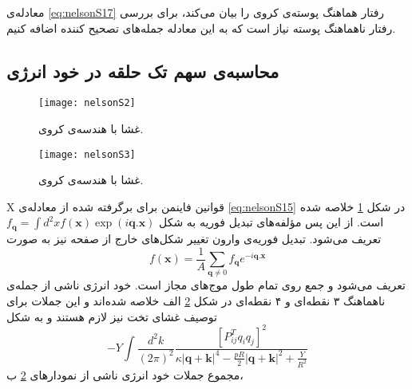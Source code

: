 معادله‌ی \ref{eq:nelsonS17}
 رفتار هماهنگ پوسته‌ی کروی را بیان می‌کند، برای بررسی رفتار ناهماهنگ پوسته نیاز است که به این معادله جمله‌های تصحیح کننده اضافه کنیم.
 \subsection{محاسبه‌ی سهم تک حلقه در خود انرژی}
 \begin{figure}[h]
\begin{center}
\texttt{[image: nelsonS2]}
\caption{
غشا با هندسه‌ی کروی.
}
\label{fig:nelsonS2}
\end{center}
\end{figure}

\begin{figure}[h]
\begin{center}
\texttt{[image: nelsonS3]}
\caption{
غشا با هندسه‌ی کروی.
}
\label{fig:nelsonS3}
\end{center}
\end{figure}
X
 قوانین فاینمن برای برگرفته شده از معادله‌ی \ref{eq:nelsonS15} 
 در شکل \ref{fig:nelsonS2}
 خلاصه شده است. از این پس مؤلفه‌های تبدیل فوریه به شکل
 $f_{\boldsymbol q}=\int d^2xf(\boldsymbol x)\exp(i\boldsymbol q.\boldsymbol x)$
 تعریف می‌شود. تبدیل فوریه‌ی وارون تغییر شکل‌های خارج از صفحه نیز به صورت
\begin{equation}
f(\boldsymbol x)=\frac{1}{A}\sum_{\boldsymbol q\neq 0}f_{\boldsymbol q}e^{-i\boldsymbol q.\boldsymbol x}
\label{eq:nelsonSٓ18}
\end{equation}
تعریف می‌شود و جمع روی تمام طول موج‌های مجاز است. خود انرژی ناشی از جمله‌ی ناهماهنگ ۳ نقطه‌ای و ۴ نقطه‌ای در شکل \ref{fig:nelsonS3}
الف خلاصه شده‌اند و این جملات برای توصیف غشای تخت نیز لازم هستند و به شکل 
\begin{equation}
-Y\int\frac{d^2k}{(2\pi)^2}\frac{\left[P_{ij}^Tq_iq_j\right]^2}{\kappa|\boldsymbol q + \boldsymbol k|^4-\frac{pR}{2}|\boldsymbol q + \boldsymbol k|^2+\frac{Y}{R^2}}
\label{eq:nelsonS19}
\end{equation}
 مجموع جملات خود انرژی ناشی از نمودارهای \ref{fig:nelsonS3}
 ب،

